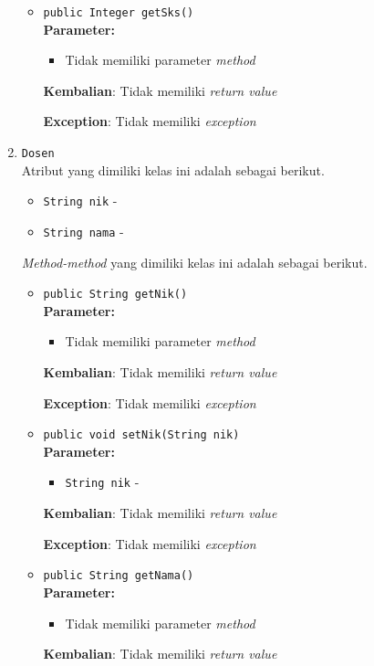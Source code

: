\documentclass{article}
\begin{document}
\begin{enumerate}
\begin{itemize}
\item \texttt{public Integer getSks()}\\ 


\textbf{Parameter:}\begin{itemize}
\item Tidak memiliki parameter \textit{method}
\end{itemize}
\textbf{Kembalian}: Tidak memiliki \textit{return value}

\textbf{Exception}: Tidak memiliki \textit{exception}

\end{itemize}
\item \texttt{Dosen}\\ 
Atribut yang dimiliki kelas ini adalah sebagai berikut.
\begin{itemize}
\item \texttt{String nik} - 
\item \texttt{String nama} - 
\end{itemize}
\textit{Method-method} yang dimiliki kelas ini adalah sebagai berikut.
\begin{itemize}
\item \texttt{public String getNik()}\\ 


\textbf{Parameter:}\begin{itemize}
\item Tidak memiliki parameter \textit{method}
\end{itemize}
\textbf{Kembalian}: Tidak memiliki \textit{return value}

\textbf{Exception}: Tidak memiliki \textit{exception}

\item \texttt{public void setNik(String nik)}\\ 


\textbf{Parameter:}\begin{itemize}
\item \texttt{String nik} - 
\end{itemize}
\textbf{Kembalian}: Tidak memiliki \textit{return value}

\textbf{Exception}: Tidak memiliki \textit{exception}

\item \texttt{public String getNama()}\\ 


\textbf{Parameter:}\begin{itemize}
\item Tidak memiliki parameter \textit{method}
\end{itemize}
\textbf{Kembalian}: Tidak memiliki \textit{return value}


\end{itemize}
\end{enumerate}
\end{document}
